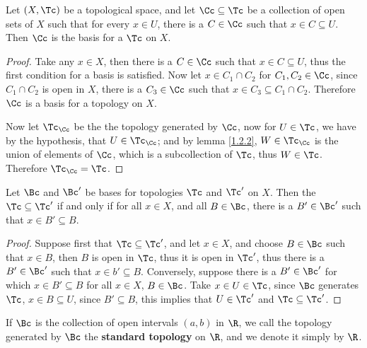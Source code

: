 \begin{lemma}\label{1.2.3}
    Let $(X,\Tc)$ be a topological space, and let  $\Cc \subseteq \Tc$ be a collection
    of open sets of  $X$ such that for every  $x \in U$, there is a  $C \in \Cc$ such that
    $x \in  C \subseteq U$. Then  $\Cc$ is the basis for a $\Tc$ on  $X$.
\end{lemma}
\begin{proof}
    Take any $x \in X$, then there is a  $C \in \Cc$ such that 	$x \in C \subseteq U$,
    thus the first condition for a basis is satisfied. Now let  $x \in C_1 \cap C_2$ for
    $C_1, C_2 \in \Cc$, since $C_1 \cap C_2$ is open in $X$, there is a  $C_3 \in \Cc$ such that
    $x \in C_3 \subseteq C_1 \cap C_2$. Therefore $\Cc$ is a basis for a topology on  $X$.

    Now let $\Tc_\Cc$ be the the topology generated by  $\Cc$, now for  $U \in \Tc$, we have
    by the hypothesis, that  $U \in \Tc_\Cc$; and by lemma \ref{1.2.2},  $W \in \Tc_\Cc$ is the
    union of elements of  $\Cc$, which is a subcollection of  $\Tc$, thus  $W \in \Tc$. Therefore
     $\Tc_\Cc=\Tc$.
\end{proof}

\begin{lemma}\label{1.2.4}
    Let $\Bc$ and  $\Bc'$ be bases for topologies  $\Tc$ and  $\Tc'$ on  $X$. Then the
     $\Tc \subseteq \Tc'$ if and only if for all  $x \in X$, and all  $B \in \Bc$, there is a  $B' \in \Bc'$
     such that  $x \in B' \subseteq B$.
\end{lemma}
\begin{proof}
    Suppose first that $\Tc \subseteq \Tc'$, and let $x \in X$, and choose  $B \in \Bc$ such that
    $x \in B$, then  $B$ is open in  $\Tc$, thus it is open in  $\Tc'$, thus there is a
     $B' \in \Bc'$ such that  $x \in b' \subseteq B$. Conversely, suppose there is a  $B' \in \Bc'$
     for which  $x \in B' \subseteq B$ for all  $x \in X$,  $B \in \Bc$. Take  $x \in U \in \Tc$, since
      $\Bc$ generates  $\Tc$,  $x \in B \subseteq U$, since  $B' \subseteq B$, this implies that $U \in \Tc'$
      and $\Tc \subseteq \Tc'$.
\end{proof}

\begin{definition}
    If $\Bc$ is the collection of open intervals $(a,b)$ in  $\R$, we call the topology generated
    by  $\Bc$ the \textbf{standard topology} on $\R$, and we denote it simply by  $\R$.
\end{definition}

